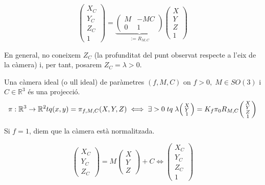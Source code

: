 \documentclass[a4paper,12pt]{article}
\begin{document}
	\begin{definicio}
		\begin{displaymath}
			\begin{pmatrix}
				X_C\\Y_C\\Z_C\\1
			\end{pmatrix}
			=
			\underbrace{\left(\begin{array}{c|c}
				M &-MC\\
				\hline
				0 & 1
		\end{array}\right)}_{:=R_{M,C}}
			\begin{pmatrix}
				X\\Y\\Z\\1
			\end{pmatrix}
		\end{displaymath}
	\end{definicio}
	En general, no coneixem $Z_C$ (la profunditat del punt observat respecte a l'eix de la càmera) i, per tant, posarem $Z_C = \lambda > 0$.
	\begin{definicio}
		Una càmera ideal (o ull ideal) de paràmetres $(f, M, C)$ on $f>0,\;M \in SO(3)$ i $C \in \mathbb{R}^3$ és una projecció.
		\begin{displaymath}
			\pi: \mathbb{R}^3 \to \mathbb{R}^2\\
			tq (x,y) = \pi_{f,M,C}(X,Y,Z) \iff \exists > 0\;tq\;\lambda \begin{psmallmatrix}X\\Y\\1\end{psmallmatrix} = K_f\pi_0 R_{M,C}\begin{psmallmatrix}X\\Y\\Z\\1\end{psmallmatrix}
		\end{displaymath}
	\end{definicio}
	\begin{obs}
		Si $f = 1$, diem que la càmera està normalitzada.
	\end{obs}
	\begin{displaymath}
		\begin{pmatrix}X_C\\Y_C\\Z_C\end{pmatrix} = M\begin{pmatrix}X\\Y\\Z\end{pmatrix} + C \iff \begin{pmatrix}X_C\\Y_C\\Z_C\\1\end{pmatrix}
	\end{displaymath}
\end{document}
